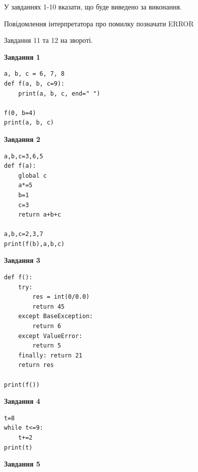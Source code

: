 \documentclass[12pt, ukrainian]{article}
\begin{document}
{{{{{{{{{{{{{{{{{У завданнях 1-10 вказати, що буде виведено за виконання.

Повідомлення інтерпретатора про помилку позначати ERROR

Завдання 11 та 12 на звороті.

\begin{minipage}[t]{7.5cm}

\begin{center}
\textbf{Завдання 1}
\end{center}

\begin{verbatim}
a, b, c = 6, 7, 8
def f(a, b, c=9):
    print(a, b, c, end=" ")

f(0, b=4)
print(a, b, c)
\end{verbatim}



\begin{center}
\textbf{Завдання 2}
\end{center}

\begin{verbatim}
a,b,c=3,6,5
def f(a):
    global c
    a*=5
    b=1
    c=3
    return a+b+c

a,b,c=2,3,7
print(f(b),a,b,c)
\end{verbatim}



\begin{center}
\textbf{Завдання 3}
\end{center}

\begin{verbatim}
def f():
    try:
        res = int(0/0.0)
        return 45
    except BaseException: 
        return 6
    except ValueError: 
        return 5
    finally: return 21
    return res

print(f())
\end{verbatim}



\begin{center}
\textbf{Завдання 4}
\end{center}

\begin{verbatim}
t=8
while t<=9:
    t+=2
print(t)
\end{verbatim}

\end{minipage}
\vline \hspace{6mm}
\begin{minipage}[t]{10.5cm}

\begin{center}
\textbf{Завдання 5}
\end{center}


\end{minipage}}}}}}}}}}}}}}}}}}
\end{document}
